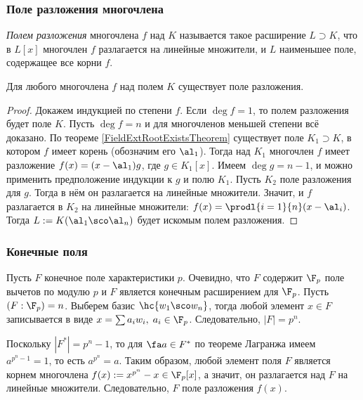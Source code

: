 \documentclass[a4paper]{article}
\begin{document}
\subsubsection{Поле разложения многочлена}

\begin{df}
\emph{Полем разложения} многочлена $f$ над $K$ называется такое расширение $L \supset K$, что в $L[x]$
многочлен $f$ разлагается на линейные множители, и $L$ наименьшее поле, содержащее все корни $f$.
\end{df}

\begin{theorem}
Для любого многочлена $f$ над полем $K$ существует поле разложения.
\end{theorem}
\begin{proof}
Докажем индукцией по степени $f$. Если $\deg f=1$, то полем разложения будет поле $K$. Пусть $\deg
f=n$ и для многочленов меньшей степени всё доказано. По теореме \ref{FieldExtRootExistsTheorem}
существует поле $K_1 \supset K$, в котором
$f$ имеет корень (обозначим его $\al_1$). Тогда над $K_1$ многочлен $f$ имеет разложение
$f(x)=(x-\al_1)g$, где $g \in K_1[x]$. Имеем $\deg g = n-1$, и можно применить предположение
индукции к $g$ и полю $K_1$. Пусть $K_2$ поле разложения для $g$. Тогда в нём он разлагается на
линейные множители. Значит, и $f$ разлагается в $K_2$ на линейные множители: $f(x)=
\prodl{i=1}{n}(x-\al_i)$. Тогда $L:=K(\al_1 \sco \al_n)$ будет искомым полем разложения.
\end{proof}

\subsubsection{Конечные поля}

Пусть $F$ конечное поле характеристики $p$. Очевидно, что $F$ содержит $\F_p$ поле вычетов по  модулю
$p$ и $F$ является конечным расширением для $\F_p$. Пусть $(F:\F_p)=n$. Выберем базис $\hc{w_1 \sco w_n}$,
тогда любой элемент $x \in F$ записывается в виде $x=\sum a_i w_i, \; a_i \in \F_p$. Следовательно,
$|F|=p^n$.

Поскольку $|F^*|= p^n-1$, то для $\fa a \in F^*$ по теореме Лагранжа имеем $a^{p^n-1}=1$, то есть
$a^{p^n}=a$.  Таким образом, любой элемент поля $F$ является корнем многочлена $f(x):=x^{p^n}-x \in \F_p[x]$,
а значит, он разлагается над $F$ на линейные множители. Следовательно, $F$ поле разложения $f(x)$.
\end{document}
